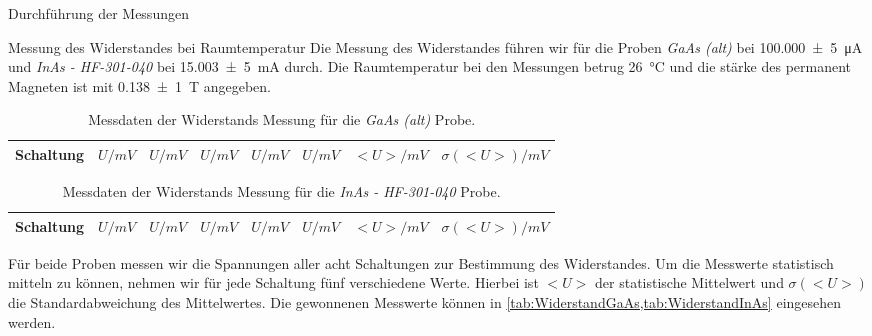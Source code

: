 \documentclass[pdftex, a4paper,11pt, twoside, ngerman]{report}
\begin{document}
  
  
  \begin{chapter}{Durchführung der Messungen}
    \label{chp:Durchführung}
    
    
    
    \begin{section}{Messung des Widerstandes bei Raumtemperatur}
      \label{chp:MessungWiderstandRaumtemperatur}
      Die Messung des Widerstandes führen wir für die Proben
      \textit{GaAs (alt)} bei \SI{100,000(5)}{\micro\ampere} und
      \textit{InAs - HF-301-040} bei \SI{15,003(5)}{\milli\ampere} durch.
      Die Raumtemperatur bei den Messungen betrug \SI{26}{\celsius} und die
      stärke des permanent Magneten ist mit \SI{0,138(1)}{\tesla} angegeben.
      \begin{table}[hb]
        \centering
        \footnotesize
        \begin{tabular}{cccccccc}
          Schaltung & $U / mV$  & $U / mV$  & $U / mV$  & $U / mV$  & $U / mV$
               & $<U> / mV$  & $\sigma(<U>) / mV$ \\ \hline \hline
          
        \end{tabular}
        \caption{Messdaten der Widerstands Messung für die \textit{GaAs (alt)}
            Probe.}
        \label{tab:WiderstandGaAs}
      \end{table}
      \begin{table}[hb]
        \centering
        \footnotesize
        \begin{tabular}{cccccccc}
          Schaltung & $U / mV$  & $U / mV$  & $U / mV$  & $U / mV$  & $U / mV$
               & $<U> / mV$  & $\sigma(<U>) / mV$ \\ \hline \hline
          
        \end{tabular}
        \caption{Messdaten der Widerstands Messung für die
            \textit{InAs - HF-301-040} Probe.}
        \label{tab:WiderstandInAs}
      \end{table}
      Für beide Proben messen wir die Spannungen aller acht Schaltungen zur
      Bestimmung des Widerstandes. Um die Messwerte statistisch mitteln zu
      können, nehmen wir für jede Schaltung fünf verschiedene Werte.
      Hierbei ist $<U>$ der statistische Mittelwert und $\sigma(<U>)$ die
      Standardabweichung des Mittelwertes.
      Die gewonnenen Messwerte können in
      \cref{tab:WiderstandGaAs,tab:WiderstandInAs} eingesehen werden.
      

\end{section}
\end{chapter}
\end{document}
